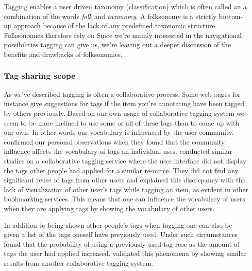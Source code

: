 Tagging enables a user driven taxonomy (classification)
which is often called an \dash{}a combination of the words
\emph{folk} and \emph{taxonomy}. A folksonomy is a strictly bottom-up
approach because of the lack of any predefined taxonomic structure.
Folksonomies therefore rely on 
Since we're mainly interested in the navigational possibilities tagging can
give us, we're leaving out a deeper discussion of the benefits and drawbacks
of folksonomies.%

\subsubsection{Tag sharing \oldand scope}

As we've described tagging is often a collaborative process. Some web pages
for instance give suggestions for tags if the item you're annotating have
been tagged by others previously. Based on our own usage of collaborative
tagging system we seem to be more inclined to use some or all of these tags
than to come up with our own. In other words our vocabulary is influenced
by the user community. \citet[]{sen06} confirmed our personal
observations when they found that the community influence affects the
vocabulary of tags an individual uses. \citet[]{farooq07} conducted
similar studies on a collaborative tagging service where the user interface
did not display the tags other people had applied for a similar resource.
They did not find any significant reuse of tags from other users and explained
this discrepancy with the lack of visualization of other user's tags while
tagging an item, as
evident in other bookmarking services. This means that one can influence
the vocabulary of users when they are applying tags by showing the
vocabulary of other users.

In addition to being shown other people's tags when tagging one can also
be given a list of the tags oneself have previously used.
Under such circumstances \citet[]{sen06} found that the probability
of using a previously used tag rose as the amount of tags the user had
applied increased. \citet[]{farooq07} validated this phenomena
by showing similar results from another collaborative tagging system.

